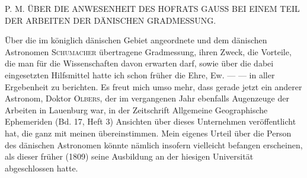\par\bigskip
{}
\begin{center}\large P. M. ÜBER DIE ANWESENHEIT DES HOFRATS GAUSS BEI EINEM TEIL DER ARBEITEN DER DÄNISCHEN GRADMESSUNG.\end{center}
\par
Über die im königlich dänischen Gebiet angeordnete und dem dänischen Astronomen \textsc{Schumacher} übertragene Gradmessung, ihren Zweck, die Vorteile, die man für die Wissenschaften davon erwarten darf, sowie über die dabei eingesetzten Hilfsmittel hatte ich schon früher die Ehre, Ew. — — in aller Ergebenheit zu berichten. Es freut mich umso mehr, dass gerade jetzt ein anderer Astronom, Doktor \textsc{Olbers}, der im vergangenen Jahr ebenfalls Augenzeuge der Arbeiten in Lauenburg war, in der Zeitschrift Allgemeine Geographische Ephemeriden (Bd. 17, Heft 3) Ansichten über dieses Unternehmen veröffentlicht hat, die ganz mit meinen übereinstimmen. Mein eigenes Urteil über die Person des dänischen Astronomen könnte nämlich insofern vielleicht befangen erscheinen, als dieser früher (1809) seine Ausbildung an der hiesigen Universität abgeschlossen hatte.
